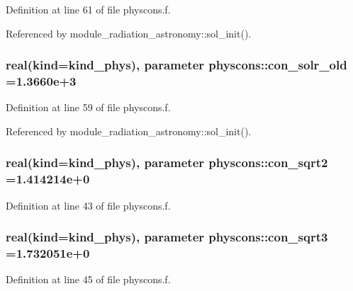 Definition at line 61 of file physcons.\+f.



Referenced by module\+\_\+radiation\+\_\+astronomy\+::sol\+\_\+init().

\subsubsection[{\texorpdfstring{con\+\_\+solr\+\_\+old}{con_solr_old}}]{\setlength{\rightskip}{0pt plus 5cm}real(kind=kind\+\_\+phys), parameter physcons\+::con\+\_\+solr\+\_\+old =1.\+3660e+3}\hypertarget{namespacephyscons_a5649a8745fd2e9fb453e6fa235c11039}{}\label{namespacephyscons_a5649a8745fd2e9fb453e6fa235c11039}


Definition at line 59 of file physcons.\+f.



Referenced by module\+\_\+radiation\+\_\+astronomy\+::sol\+\_\+init().

\subsubsection[{\texorpdfstring{con\+\_\+sqrt2}{con_sqrt2}}]{\setlength{\rightskip}{0pt plus 5cm}real(kind=kind\+\_\+phys), parameter physcons\+::con\+\_\+sqrt2 =1.\+414214e+0}\hypertarget{namespacephyscons_a2cf7f8b3a5721fe3b0be2afe5f19a352}{}\label{namespacephyscons_a2cf7f8b3a5721fe3b0be2afe5f19a352}


Definition at line 43 of file physcons.\+f.

\subsubsection[{\texorpdfstring{con\+\_\+sqrt3}{con_sqrt3}}]{\setlength{\rightskip}{0pt plus 5cm}real(kind=kind\+\_\+phys), parameter physcons\+::con\+\_\+sqrt3 =1.\+732051e+0}\hypertarget{namespacephyscons_ac8a4f35ffde9c6d239cd11a9158e4cc6}{}\label{namespacephyscons_ac8a4f35ffde9c6d239cd11a9158e4cc6}


Definition at line 45 of file physcons.\+f.

